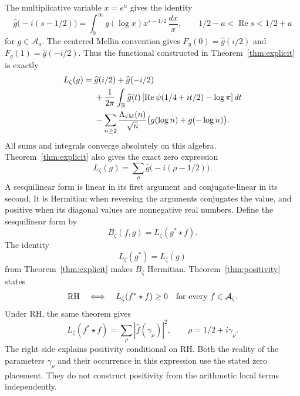 \documentclass[11pt]{article}
\numberwithin{equation}{section}
\newcommand{\cA}{\mathcal A}
\newcommand{\R}{\mathbb R}
\newcommand{\A}{\mathcal A}
\begin{document}
The multiplicative variable $x=e^u$ gives the identity
\begin{equation}
 \widehat g\bigl(-i(s-1/2)\bigr)
 =\int_0^\infty g(\log x)x^{s-1/2}\,\frac{dx}{x},
 \qquad 1/2-a<\operatorname{Re}s<1/2+a
 \label{eq:mellin}
\end{equation}
for $g\in\A_a$.
The centered Mellin convention gives
$F_g(0)=\widehat g(i/2)$ and $F_g(1)=\widehat g(-i/2)$.
Thus the functional constructed in Theorem~\ref{thm:explicit} is exactly
\begin{equation}
\begin{split}
 L_\zeta(g)={}&\widehat g(i/2)+\widehat g(-i/2)\\
 &+\frac1{2\pi}\int_{\R}\widehat g(t)
   \left[\operatorname{Re}\psi(1/4+it/2)-\log\pi\right]dt\\
 &-\sum_{n\geq2}\frac{\Lambda_{\rm vM}(n)}{\sqrt n}
                 \bigl(g(\log n)+g(-\log n)\bigr).
\end{split}
\label{eq:weil-functional}
\end{equation}
All sums and integrals converge absolutely on this algebra.
Theorem~\ref{thm:explicit} also gives the exact zero expression
\begin{equation}
 L_\zeta(g)=\sum_\rho\widehat g\bigl(-i(\rho-1/2)\bigr).
 \label{eq:explicit}
\end{equation}
A sesquilinear form is linear in its first argument and conjugate-linear in
its second.  It is Hermitian when reversing the arguments conjugates the
value, and positive when its diagonal values are nonnegative real numbers.
Define the sesquilinear form by
\[
 B_\zeta(f,g)=L_\zeta(g^*\star f).
\]
The identity
\begin{equation}
 L_\zeta(g^*)=\overline{L_\zeta(g)}
 \label{eq:hermitian}
\end{equation}
from Theorem~\ref{thm:explicit} makes $B_\zeta$ Hermitian.
Theorem~\ref{thm:positivity} states
\begin{equation}
 \mathrm{RH}\quad\Longleftrightarrow\quad
 L_\zeta(f^*\star f)\geq0\quad\hbox{for every }f\in\cA_\zeta.
 \label{eq:weil-criterion}
\end{equation}
Under RH, the same theorem gives
\begin{equation}
 L_\zeta(f^*\star f)=\sum_\rho|\widehat f(\gamma_\rho)|^2,
 \qquad \rho=1/2+i\gamma_\rho.
 \label{eq:zero-norm}
\end{equation}
The right side explains positivity conditional on RH.  Both the reality
of the parameters $\gamma_\rho$ and their occurrence in this expression
use the stated zero placement.  They do not construct positivity from the
arithmetic local terms independently.
\end{document}

